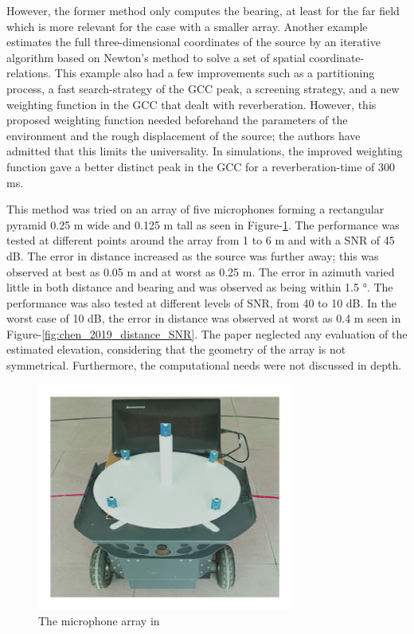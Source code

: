 \documentclass[notitlepage]{report}
\begin{document}
However, the former method only computes the bearing, at least for the far field which is more relevant for the case with a smaller array. Another example \cite{chen_sound_2019} estimates the full three-dimensional coordinates of the source by an iterative algorithm based on Newton's method to solve a set of spatial coordinate-relations. This example also had a few improvements such as a partitioning process, a fast search-strategy of the GCC peak, a screening strategy, and a new weighting function in the GCC that dealt with reverberation. However, this proposed weighting function needed beforehand the parameters of the environment and the rough displacement of the source; the authors have admitted that this limits the universality. In simulations, the improved weighting function gave a better distinct peak in the GCC for a reverberation-time of 300 \si{ms}. 

This method was tried on an array of five microphones forming a rectangular pyramid 0.25 \si{m} wide and 0.125 \si{m} tall as seen in Figure-\ref{fig:chen_2019_array}. The performance was tested at different points around the array from 1 to 6 \si{m} and with a SNR of 45 \si{dB}. The error in distance increased as the source was further away; this was observed at best as 0.05 \si{m} and at worst as 0.25 \si{m}. The error in azimuth varied little in both distance and bearing and was observed as being within 1.5 \si{\degree}. The performance was also tested at different levels of SNR, from 40 to 10 \si{dB}. In the worst case of 10 \si{dB}, the error in distance was observed at worst as 0.4 \si{m} seen in Figure-\ref{fig:chen_2019_distance_SNR}. The paper neglected any evaluation of the estimated elevation, considering that the geometry of the array is not symmetrical. Furthermore, the computational needs were not discussed in depth.

\begin{figure}[H]
\includegraphics[width=0.75\textwidth]{./chen_2019/array.jpg}
\centering
\caption{The microphone array in \cite{chen_sound_2019}}
\label{fig:chen_2019_array}
\centering
\end{figure}
\end{document}
